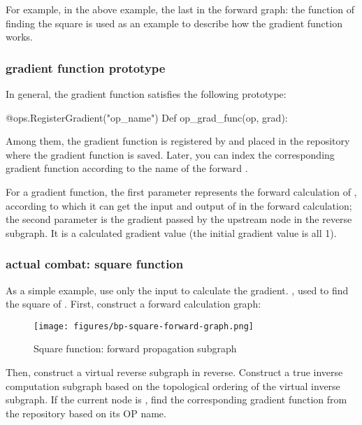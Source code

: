 \begin{content}
For example, in the above example, the last  in the forward graph: the function of finding the square is used as an example to describe how the gradient function works.

\subsubsection{gradient function prototype}

In general, the gradient function satisfies the following prototype:

\begin{leftbar}
\begin{python}
@ops.RegisterGradient("op_name")
Def op_grad_func(op, grad):
\end{python}
\end{leftbar}

Among them, the gradient function is registered by  and placed in the repository where the gradient function is saved. Later, you can index the corresponding gradient function according to the name of the forward .

For a gradient function, the first parameter  represents the forward calculation of , according to which it can get the input and output of  in the forward calculation; the second parameter  is the gradient passed by the upstream node in the reverse subgraph. It is a calculated gradient value (the initial gradient value is all 1).

\subsubsection{actual combat: square function}

As a simple example, use only the input to calculate the gradient. , used to find the square of . First, construct a forward calculation graph:

\begin{figure}[!h]
\centering
\texttt{[image: figures/bp-square-forward-graph.png]}
\caption{Square function: forward propagation subgraph}
 \label{fig:bp-square-forward-graph}
\end{figure}

Then, construct a virtual reverse subgraph in reverse. Construct a true inverse computation subgraph based on the topological ordering of the virtual inverse subgraph. If the current node is , find the corresponding gradient function  from the repository based on its OP name.


\end{content}
